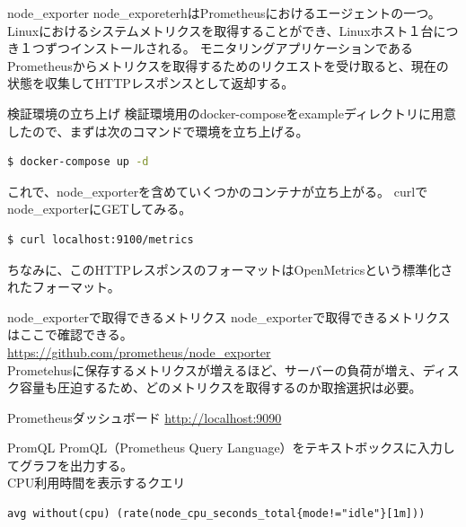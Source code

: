 \documentclass{beamer}
\begin{document}
\begin{frame}{node\_exporter}
  node\_exporeterhはPrometheusにおけるエージェントの一つ。Linuxにおけるシステムメトリクスを取得することができ、Linuxホスト１台につき１つずつインストールされる。
  モニタリングアプリケーションであるPrometheusからメトリクスを取得するためのリクエストを受け取ると、現在の状態を収集してHTTPレスポンスとして返却する。
\end{frame}

\begin{frame}[fragile]{検証環境の立ち上げ}
  検証環境用のdocker-composeをexampleディレクトリに用意したので、まずは次のコマンドで環境を立ち上げる。

  \begin{lstlisting}[language=bash]
    $ docker-compose up -d
  \end{lstlisting}

  これで、node\_exporterを含めていくつかのコンテナが立ち上がる。
  curlでnode\_exporterにGETしてみる。

  \begin{lstlisting}[language=bash]
    $ curl localhost:9100/metrics
  \end{lstlisting}

  ちなみに、このHTTPレスポンスのフォーマットはOpenMetricsという標準化されたフォーマット。
\end{frame}

\begin{frame}{node\_exporterで取得できるメトリクス}
  node\_exporterで取得できるメトリクスはここで確認できる。\\
  \href{https://github.com/prometheus/node\_exporter}{https://github.com/prometheus/node\_exporter}\\
  Prometehusに保存するメトリクスが増えるほど、サーバーの負荷が増え、ディスク容量も圧迫するため、どのメトリクスを取得するのか取捨選択は必要。
\end{frame}

\begin{frame}{Prometheusダッシュボード}
  \href{http://localhost:9090}{http://localhost:9090} \\
\end{frame}

\begin{frame}[fragile]{PromQL}
  PromQL（Prometheus Query Language）をテキストボックスに入力してグラフを出力する。\\
  CPU利用時間を表示するクエリ
  \begin{lstlisting}[basicstyle=\tiny]
    avg without(cpu) (rate(node_cpu_seconds_total{mode!="idle"}[1m]))
  \end{lstlisting}
\end{frame}
\end{document}
